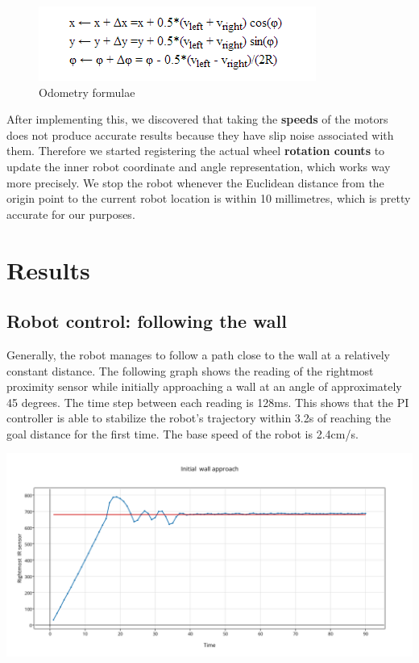\documentclass[10pt,a4paper]{article}
\begin{document}
\begin{figure}[htbp]
\centering
\includegraphics{images/Odometry_formulae.png}
\caption{Odometry formulae}
\end{figure}

After implementing this, we discovered that taking the \textbf{speeds}
of the motors does not produce accurate results because they have slip
noise associated with them. Therefore we started registering the actual
wheel \textbf{rotation counts} to update the inner robot coordinate and
angle representation, which works way more precisely. We stop the robot
whenever the Euclidean distance from the origin point to the current
robot location is within 10 millimetres, which is pretty accurate for
our purposes.

\section{Results}\label{results}

\subsection{Robot control: following the
wall}\label{robot-control-following-the-wall}

Generally, the robot manages to follow a path close to the wall at a
relatively constant distance. The following graph shows the reading of
the rightmost proximity sensor while initially approaching a wall at an
angle of approximately 45 degrees. The time step between each reading is
128ms. This shows that the PI controller is able to stabilize the
robot's trajectory within 3.2s of reaching the goal distance for the
first time. The base speed of the robot is 2.4cm/s.
\begin{center}
\includegraphics[width=15cm]{images/initial_wall_approach.png}
\end{center}
\end{document}
